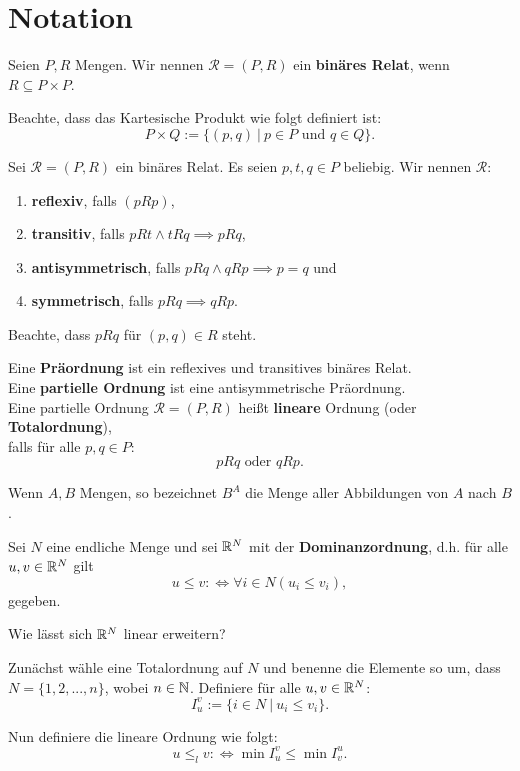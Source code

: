 \chapter{Notation}
\renewcommand{\|}{~|~}
\begin{definition}
    Seien $P,R$ Mengen. Wir nennen $\mathscr{R} = (P,R)$ ein \textbf{binäres Relat}, 
    wenn $R \subseteq P \times P$.

    Beachte, dass das Kartesische Produkt wie folgt definiert ist:
    $$ P \times Q := \{(p,q) \| p \in P \textrm{ und } q \in Q\}.$$
\end{definition}

\begin{definition}
    Sei $\mathscr{R} = (P,R)$ ein binäres Relat. Es seien $p,t,q \in P$ beliebig.
    Wir nennen $\mathscr{R}$:
    \begin{enumerate}[label=(\arabic*)]
        \item \textbf{reflexiv}, falls $(pRp)$,
        \item \textbf{transitiv}, falls $pRt \land tRq \implies pRq$,
        \item \textbf{antisymmetrisch}, falls $pRq \land qRp \implies p=q$ und
        \item \textbf{symmetrisch}, falls $pRq \implies qRp$.
    \end{enumerate}

    Beachte, dass $pRq$ für $(p,q) \in R$ steht.
\end{definition}

\begin{definition}
    Eine \textbf{Präordnung} ist ein reflexives und transitives binäres Relat. \\
    Eine \textbf{partielle Ordnung} ist eine antisymmetrische Präordnung. \\
    Eine partielle Ordnung $\mathscr{R} = (P,R)$ heißt \textbf{lineare} Ordnung (oder \textbf{Totalordnung}),\\
    falls für alle $p,q \in P$: $$pRq \textrm{ oder } qRp.$$
\end{definition}

\begin{notation}
    Wenn $A,B$ Mengen, so bezeichnet $B^A$ die Menge aller Abbildungen von $A$ nach $B$.
\end{notation}

\begin{aufgabe}
    Sei $N$ eine endliche Menge und 
    sei $\mathbb{R}^N$ mit der \textbf{Dominanzordnung}, d.h. für alle $u,v \in \mathbb{R}^N$ gilt
    $$u \leq v :\iff \forall i \in N (u_i \leq v_i),$$
    gegeben.
    
    Wie lässt sich $\mathbb{R}^N$ linear erweitern?
\end{aufgabe}
\begin{lösung}
    Zunächst wähle eine Totalordnung auf $ N $ und benenne die Elemente so um, dass
    $N = \{1,2,...,n\}$, wobei $n \in \mathbb{N}$.
    Definiere für alle $u,v \in \mathbb{R}^N$:
    $$ I^v_u := \{i \in N \| u_i \leq v_i\}.$$

    Nun definiere die lineare Ordnung wie folgt:
    $$ u \leq_l v :\iff \min I^v_u \leq \min I^u_v.$$
\end{lösung}
 